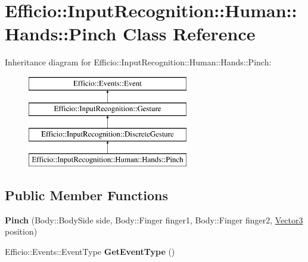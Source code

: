\hypertarget{class_efficio_1_1_input_recognition_1_1_human_1_1_hands_1_1_pinch}{}\section{Efficio\+:\+:Input\+Recognition\+:\+:Human\+:\+:Hands\+:\+:Pinch Class Reference}
\label{class_efficio_1_1_input_recognition_1_1_human_1_1_hands_1_1_pinch}
Inheritance diagram for Efficio\+:\+:Input\+Recognition\+:\+:Human\+:\+:Hands\+:\+:Pinch\+:\begin{figure}[H]
\begin{center}
\leavevmode
\includegraphics[height=4.000000cm]{class_efficio_1_1_input_recognition_1_1_human_1_1_hands_1_1_pinch}
\end{center}
\end{figure}
\subsection*{Public Member Functions}
\begin{DoxyCompactItemize}
\item 
{\bfseries Pinch} (Body\+::\+Body\+Side side, Body\+::\+Finger finger1, Body\+::\+Finger finger2, \hyperlink{class_efficio_1_1_vector3}{Vector3} position)\hypertarget{class_efficio_1_1_input_recognition_1_1_human_1_1_hands_1_1_pinch_a8471ee0196227f2c491925955449f534}{}\label{class_efficio_1_1_input_recognition_1_1_human_1_1_hands_1_1_pinch_a8471ee0196227f2c491925955449f534}

\item 
Efficio\+::\+Events\+::\+Event\+Type {\bfseries Get\+Event\+Type} ()\hypertarget{class_efficio_1_1_input_recognition_1_1_human_1_1_hands_1_1_pinch_a579897e092310066f9dab8df222fc863}{}\label{class_efficio_1_1_input_recognition_1_1_human_1_1_hands_1_1_pinch_a579897e092310066f9dab8df222fc863}

\end{DoxyCompactItemize}
